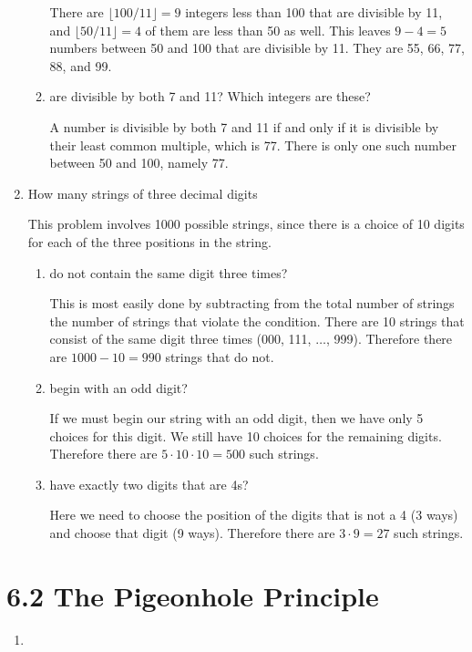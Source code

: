 \documentclass[11pt]{article}
\begin{document}
\begin{enumerate}[label=\textbf{\arabic*.}]
\begin{enumerate}[label=\textbf{\alph*)}]
		There are $\lfloor 100 / 11 \rfloor = 9$ integers less than 100 that are divisible by 11, and $\lfloor 50 / 11 \rfloor = 4$ of them are less than 50 as well. This leaves $9 - 4 = 5$ numbers between 50 and 100 that are divisible by 11. They are 55, 66, 77, 88, and 99.
		
		\item are divisible by both 7 and 11? Which integers are these?
		
		A number is divisible by both 7 and 11 if and only if it is divisible by their least common multiple, which is 77. There is only one such number between 50 and 100, namely 77.
	\end{enumerate}

	\item How many strings of three decimal digits
	
	This problem involves 1000 possible strings, since there is a choice of 10 digits for each of the three positions in the string.
	
	\begin{enumerate}[label=\textbf{\alph*)}]
		\item do not contain the same digit three times?
		
		This is most easily done by subtracting from the total number of strings the number of strings that violate the condition. There are 10 strings that consist of the same digit three times (000, 111, $\ldots$, 999). Therefore there are $1000 - 10 = 990$ strings that do not.
		
		\item begin with an odd digit?
		
		If we must begin our string with an odd digit, then we have only 5 choices for this digit. We still have 10 choices for the remaining digits. Therefore there are $5 \cdot 10 \cdot 10 = 500$ such strings.
		
		\item have exactly two digits that are 4s?
		
		Here we need to choose the position of the digits that is not a 4 (3 ways) and choose that digit (9 ways). Therefore there are $3 \cdot 9 = 27$ such strings.
	\end{enumerate}
\end{enumerate}

\section*{\textbf{6.2 The Pigeonhole Principle}}
\begin{enumerate}[label=\textbf{\arabic*.}]
	\item 
\end{enumerate}
\end{document}
